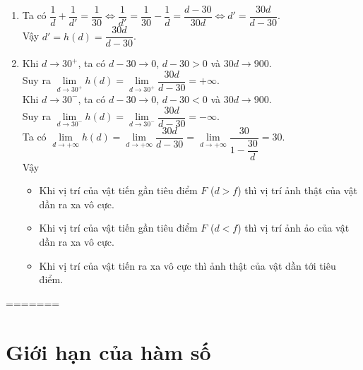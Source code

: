 \begin{bt}
{\begin{enumerate}
			\item Ta có $\dfrac{1}{d}+\dfrac{1}{d'}=\dfrac{1}{30} \Leftrightarrow \dfrac{1}{d'} = \dfrac{1}{30} - \dfrac{1}{d} = \dfrac{d-30}{30d} \Leftrightarrow d'= \dfrac{30d}{d-30}$. \\
			Vậy $d'=h(d) = \dfrac{30d}{d-30}$.
			\item 
			Khi $d\to 30^+$, ta có $d-30 \to 0$, $d-30 >0$ và $30d \to 900$.\\
			Suy ra $\lim\limits _{d \rightarrow 30^{+}} h(d) = \lim\limits _{d \rightarrow 30^{+}} \dfrac{30d}{d-30} = +\infty$. \\
			Khi $d\to 30^-$, ta có $d-30 \to 0$, $d-30 <0$ và $30d \to 900$.\\
			Suy ra $\lim\limits _{d \rightarrow 30^{-}} h(d) = \lim\limits _{d \rightarrow 30^{-}} \dfrac{30d}{d-30} = -\infty$. \\
			Ta có $\lim\limits _{d \rightarrow +\infty} h(d) =  \lim\limits _{d \rightarrow +\infty} \dfrac{30d}{d-30} = \lim\limits _{d \rightarrow +\infty}  \dfrac{30}{1-\dfrac{30}{d}} =30$. \\
			Vậy 
			\begin{itemize}
				\item  Khi vị trí của vật tiến gần  tiêu điểm $F$ ($d >f$) thì vị trí ảnh thật của vật dần ra xa vô cực. 
				\item  Khi vị trí của vật tiến gần  tiêu điểm $F$ ($d <f$) thì vị trí ảnh ảo của vật dần ra xa vô cực. 
				\item  Khi vị trí của vật tiến ra xa vô cực thì  ảnh thật của vật dần tới tiêu điểm. 
			\end{itemize}
		\end{enumerate}
	}
\end{bt}


=======
\section{Giới hạn của hàm số}
\setcounter{dang}{0}
